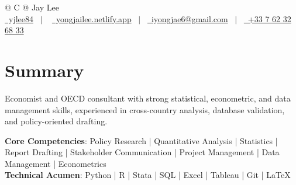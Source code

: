 \documentclass[a4paper,12pt]{article}
\begin{document}
\pagestyle{empty} 



\begin{tabularx}{\linewidth}{@{} C @{}}
\Huge{Jay Lee} \\[7.5pt]
\href{https://github.com/yjlee84}{\raisebox{-0.05\height}\faGithub\ yjlee84} \ $|$ \ 
\href{https://yongjailee.netlify.app}{\raisebox{-0.05\height}\faGlobe \ yongjailee.netlify.app} \ $|$ \ 
\href{mailto:email@mysite.com}{\raisebox{-0.05\height}\faEnvelope \ iyongjae6@gmail.com} \ $|$ \ 
\href{tel:+000000000000}{\raisebox{-0.05\height}\faMobile \ +33 7 62 32 68 33} \\
\end{tabularx}


\section{Summary}
Economist and OECD consultant with strong statistical, econometric, and data management skills, experienced in cross-country analysis, database validation, and policy-oriented drafting.

\textbf{Core Competencies}: Policy Research | Quantitative Analysis | Statistics | Report Drafting | Stakeholder Communication | Project Management | Data Management | Econometrics\\
\textbf{Technical Acumen}: Python | R | Stata | SQL | Excel | Tableau | Git | \LaTeX{}
\end{document}
